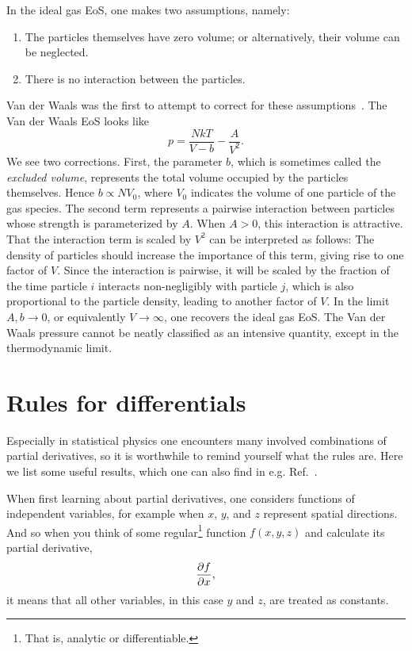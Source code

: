 In the ideal gas EoS, one makes two assumptions, namely:
\begin{enumerate}
\item The particles themselves have zero volume; or alternatively,
their volume can be neglected. 
\item There is no interaction between the particles.
\end{enumerate}
Van der Waals was the first to attempt to correct for these 
assumptions~\cite{van_der_waals_over_1873}. The Van der Waals EoS looks like
\begin{equation}\label{eq:vanderwaals}
p=\frac{NkT}{V-b}-\frac{A}{V^2}.
\end{equation}
We see two corrections. First, the parameter $b$, which is sometimes
called the {\it excluded volume}, represents the total
volume occupied by the particles themselves. Hence $b\propto NV_0$, where $V_0$
indicates the volume of one particle of the gas species. The second term
represents a pairwise interaction between particles whose strength
is parameterized by $A$. When $A>0$, this interaction is attractive.
That the interaction term is scaled by $V^2$ can be interpreted as follows:
The density of particles should increase the importance of this term, giving
rise to one factor of $V$. Since the interaction is pairwise, it will be scaled
by the fraction of the time particle $i$ interacts non-negligibly with particle
$j$, which is also proportional to the particle density, leading to another
factor of $V$. In the limit $A,b\to0$, or equivalently $V\to\infty$,
one recovers the ideal gas EoS.
The Van der Waals pressure cannot be neatly classified as an intensive quantity,
except in the thermodynamic limit. 


\section{Rules for differentials}\label{sec:thermdiff}

Especially in statistical physics one encounters many involved combinations
of partial derivatives, so it is worthwhile to remind yourself what the
rules are. Here we list some useful results, which one can also
find in e.g. Ref.~\cite{huang_introduction_2001}.

When first learning about partial derivatives, one considers functions
of independent variables, for example when $x$, $y$, and $z$ represent
spatial directions. And so when you think of some
regular\footnote{That is, analytic or differentiable.} 
function $f(x,y,z)$
and calculate its partial derivative,
\begin{equation}
\pdv{f}{x},
\end{equation}
it means that all other variables, in this case $y$ and $z$, are treated as
constants.


